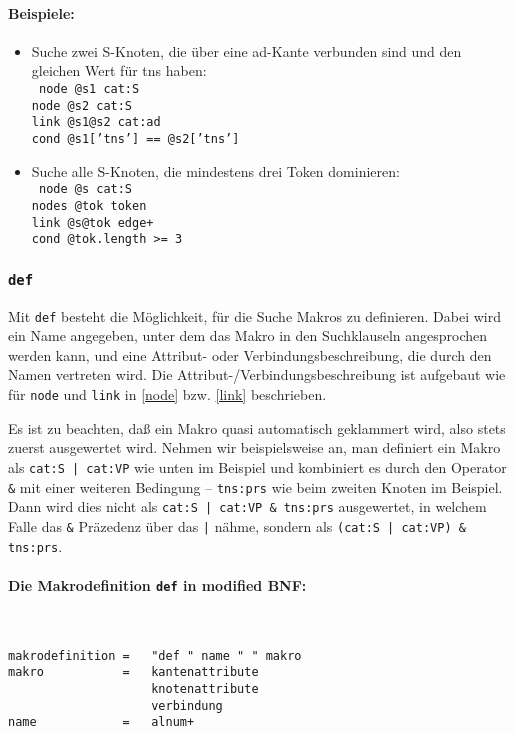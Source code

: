 \documentclass[12pt]{scrartcl}
\begin{document}
{\paragraph*{Beispiele:}
\begin{itemize}
	\item Suche zwei S-Knoten, die über eine ad-Kante verbunden sind und den gleichen Wert für tns haben:\\
	{\tt
	node @s1 cat:S\\[-.4ex]
	node @s2 cat:S\\[-.4ex]
	link @s1@s2 cat:ad\\[-.4ex]
	cond @s1['tns'] == @s2['tns']
	}
	\item Suche alle S-Knoten, die mindestens drei Token dominieren:\\
	{\tt
	node @s cat:S\\[-.4ex]
	nodes @tok token\\[-.4ex]
	link @s@tok edge+\\[-.4ex]
	cond @tok.length >= 3
	}
\end{itemize}


\subsubsection{\texttt{def}}\label{def}

Mit \texttt{def} besteht die Möglichkeit, für die Suche Makros zu definieren. Dabei wird ein Name angegeben, unter dem das Makro in den Suchklauseln angesprochen werden kann, und eine Attribut- oder Verbindungsbeschreibung, die durch den Namen vertreten wird. Die Attribut-/Verbindungsbeschreibung ist aufgebaut wie für \texttt{node} und \texttt{link} in \ref{node} bzw. \ref{link} beschrieben.

Es ist zu beachten, daß ein Makro quasi automatisch geklammert wird, also stets zuerst ausgewertet wird. Nehmen wir beispielsweise an, man definiert ein Makro als \texttt{cat:S | cat:VP} wie unten im Beispiel und kombiniert es durch den Operator \texttt{\&} mit einer weiteren Bedingung – \texttt{tns:prs} wie beim zweiten Knoten im Beispiel. Dann wird dies nicht als \texttt{cat:S | cat:VP \& tns:prs} ausgewertet, in welchem Falle das \texttt{\&} Präzedenz über das \texttt{|} nähme, sondern als \texttt{(cat:S | cat:VP) \& tns:prs}.

\paragraph*{Die Makrodefinition \texttt{def} in modified BNF:}
~
\begin{framed}
\begin{lstlisting}
makrodefinition =   "def " name " " makro
makro           =   kantenattribute
                    knotenattribute
                    verbindung
name            =   alnum+
\end{lstlisting}
\end{framed}


}
\end{document}
